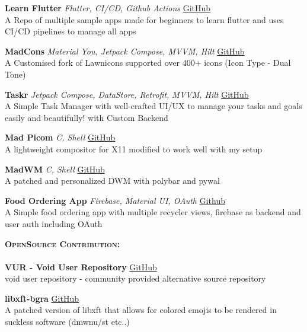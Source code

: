 \documentclass[a4paper]{article}
\newcommand{\lineunder} {
    \vspace*{-8pt} \\
    \hspace*{-18pt} \hrulefill \\
}
\newcommand{\header} [1] {
    {\hspace*{-18pt}\vspace*{6pt} \textsc{#1} }
    \vspace*{-6pt} \lineunder
}
\begin{document}
{\textbf{Learn Flutter}} {\sl Flutter, CI/CD, Github Actions} 
    \hfill \href{https://github.com/MadFlasheroo7/Learn-Flutter}{GitHub}\\
    A Repo of multiple sample apps made for beginners to learn flutter and uses CI/CD pipelines to manage all apps\\
\vspace*{2mm}

{\textbf{MadCons}} {\sl Material You, Jetpack Compose, MVVM, Hilt} 
    \hfill \href{https://github.com/MadFlasheroo7/madcons}{GitHub}\\
    A Customised fork of Lawnicons supported over 400+ icons (Icon Type - Dual Tone)\\
\vspace*{2mm}

{\textbf{Taskr}} {\sl Jetpack Compose, DataStore, Retrofit, MVVM, Hilt} 
    \hfill \href{https://github.com/taskr-org}{GitHub}\\
    A Simple Task Manager with well-crafted UI/UX to manage your tasks and goals easily and beautifully! with Custom Backend\\
\vspace*{2mm}

{\textbf{Mad Picom}} {\sl C, Shell} 
    \hfill \href{https://github.com/MadFlasheroo7/mad-picom}{GitHub}\\
    A lightweight compositor for X11 modified to work well with my setup\\
\vspace*{2mm}

{\textbf{MadWM}} {\sl C, Shell} 
    \hfill \href{https://github.com/MadFlasheroo7/madwm}{GitHub}\\
    A patched and personalized DWM with polybar and pywal\\
\vspace*{2mm}

{\textbf{Food Ordering App}} {\sl Firebase, Material UI, OAuth} 
    \hfill \href{https://github.com/MadFlasheroo7/Cloud\_Backend}{Github}\\
    A Simple food ordering app with multiple recycler views, firebase as backend and user auth including OAuth\\
\vspace*{2mm}

\header{\textbf{OpenSource Contribution:}}
\textbf{VUR - Void User Repository} 
    \hfill \href{https://github.com/MadFlasheroo7/VUR}{GitHub}\\
    void user repository - community provided alternative source repository\\
\vspace*{2mm}

\textbf{libxft-bgra} 
    \hfill \href{https://github.com/MadFlasheroo7/libxft-bgra}{GitHub}\\
    A patched version of libxft that allows for colored emojis to be rendered in suckless software (dmwnu/st etc..)\\
\vspace*{2mm}
\end{document}

